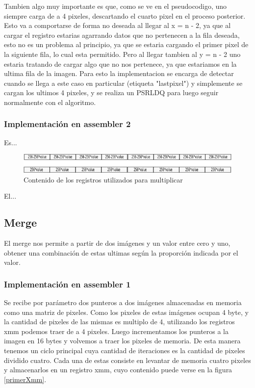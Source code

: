\documentclass[a4paper]{article}
\begin{document}
Tambien algo muy importante es que, como se ve en el pseudocodigo, uno siempre carga de a 4 pixeles, descartando el cuarto pixel en el proceso posterior. Esto va a comportarse de forma no deseada al llegar al x = n - 2, ya que al cargar el registro estarias agarrando datos que no pertenecen a la fila deseada, esto no es un problema al principio, ya que se estaria cargando el primer pixel de la siguiente fila, lo cual esta permitido. Pero al llegar tambien al y = n - 2 uno estaria tratando de cargar algo que no nos pertenece, ya que estariamos en la ultima fila de la imagen. Para esto la implementacion se encarga de detectar cuando se llega a este caso en particular (etiqueta "lastpixel") y simplemente se cargan los ultimos 4 pixeles, y se realiza un PSRLDQ para luego seguir normalmente con el algoritmo.

\subsubsection{Implementación en assembler 2}

Es...

\begin{figure}[H]
\centering
\includegraphics[scale=0.8]{imagenes/256value.png}
\caption{Contenido de los registros utilizados para multiplicar}
\label{256value2}
\end{figure}

El...


\subsection{Merge}

El merge nos permite a partir de dos imágenes y un valor entre cero y uno, obtener una combinación de estas ultimas según la proporción indicada por el valor.

\subsubsection{Implementación en assembler 1}

Se recibe por parámetro dos punteros a dos imágenes almacenadas en memoria como una matriz de pixeles. Como los pixeles de estas imágenes ocupan 4 byte, y la cantidad de pixeles de las mismas es multiplo de 4,  utilizando los registros xmm podemos traer de a 4 pixeles. Luego incrementamos los punteros a la imagen en 16 bytes y volvemos a traer los pixeles de memoria. De esta manera tenemos un ciclo principal cuya cantidad de iteraciones es la cantidad de pixeles dividido cuatro. Cada una de estas consiste en levantar de memoria cuatro pixeles y almacenarlos en un registro xmm, cuyo contenido puede verse en la figura \ref{primerXmm}.
\end{document}
